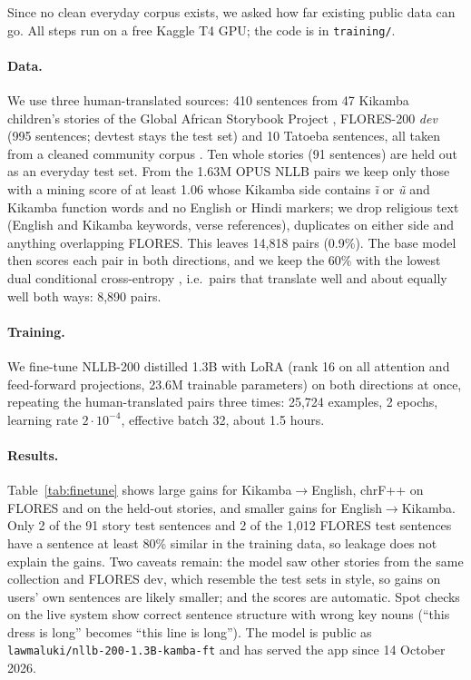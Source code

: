\documentclass[11pt]{article}
\begin{document}
Since no clean everyday corpus exists, we asked how far existing public data can go. All steps run on a free Kaggle T4 GPU; the code is in \texttt{training/}.

\paragraph{Data.} We use three human-translated sources: 410 sentences from 47 Kikamba children's stories of the Global African Storybook Project \citep{asp2026source}, FLORES-200 \emph{dev} (995 sentences; devtest stays the test set) and 10 Tatoeba sentences, all taken from a cleaned community corpus \citep{kithyadan2026corpus}. Ten whole stories (91 sentences) are held out as an everyday test set. From the 1.63M OPUS NLLB pairs we keep only those with a mining score of at least 1.06 whose Kikamba side contains \emph{\~{\i}} or \emph{\~{u}} and Kikamba function words and no English or Hindi markers; we drop religious text (English and Kikamba keywords, verse references), duplicates on either side and anything overlapping FLORES. This leaves 14,818 pairs (0.9\%). The base model then scores each pair in both directions, and we keep the 60\% with the lowest dual conditional cross-entropy \citep{junczys2018dual}, i.e.\ pairs that translate well and about equally well both ways: 8,890 pairs.

\paragraph{Training.} We fine-tune NLLB-200 distilled 1.3B with LoRA \citep{hu2022lora} (rank 16 on all attention and feed-forward projections, 23.6M trainable parameters) on both directions at once, repeating the human-translated pairs three times: 25,724 examples, 2 epochs, learning rate $2\cdot10^{-4}$, effective batch 32, about 1.5 hours.

\paragraph{Results.} Table~\ref{tab:finetune} shows large gains for Kikamba$\rightarrow$English, \ftGainFloresKamEn{} chrF++ on FLORES and \ftGainStoryKamEn{} on the held-out stories, and smaller gains for English$\rightarrow$Kikamba. Only 2 of the 91 story test sentences and 2 of the 1,012 FLORES test sentences have a sentence at least 80\% similar in the training data, so leakage does not explain the gains. Two caveats remain: the model saw other stories from the same collection and FLORES dev, which resemble the test sets in style, so gains on users' own sentences are likely smaller; and the scores are automatic. Spot checks on the live system show correct sentence structure with wrong key nouns (``this dress is long'' becomes ``this line is long''). The model is public as \texttt{lawmaluki/nllb-200-1.3B-kamba-ft} and has served the app since 14 October 2026.
\end{document}
